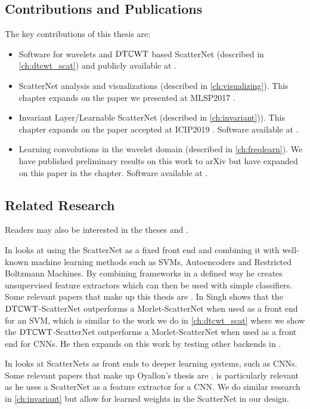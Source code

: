 \subsection{Contributions and Publications}
The key contributions of this thesis are:

\begin{itemize}
  \item Software for wavelets and $\mathrm{DT}\mathbb{C}\mathrm{WT}$ based ScatterNet (described in \autoref{ch:dtcwt_scat})
    and publicly available at \cite{cotter_pytorch_2018}.
  \item ScatterNet analysis and visualizations (described in
    \autoref{ch:visualizing}). This chapter expands on the paper we presented at MLSP2017
    \cite{cotter_visualizing_2017}.
  \item Invariant Layer/Learnable ScatterNet (described in \autoref{ch:invariant})). This chapter expands
    on the paper accepted at ICIP2019 \cite{cotter_learnable_2019}. Software
    available at \cite{cotter_learnable_2019-1}.
  \item Learning convolutions in the wavelet domain (described in
    \autoref{ch:freqlearn}). We have published preliminary results on this work
    to arXiv \cite{cotter_deep_2018} but have expanded on this paper in the
    chapter. Software available at \cite{cotter_dtcwt_2018}.
\end{itemize}

\subsection{Related Research}
Readers may also be interested in the theses \cite{singh_scatternet_2018} and
\cite{oyallon_analyzing_2017}.

In \cite{singh_scatternet_2018}
\citeauthor{singh_scatternet_2018} looks at using the ScatterNet as a fixed
front end and combining it with well-known machine learning methods such as
SVMs, Autoencoders and Restricted Boltzmann Machines. By combining frameworks in
a defined way he creates unsupervised feature extractors which can then be used
with simple classifiers. Some relevant papers that make up this thesis are \cite{singh_multi-resolution_2016,
singh_scatternet_2017, singh_generative_2018}. In
\cite{singh_multi-resolution_2016} Singh shows
that the $\mathrm{DT}\mathbb{C}\mathrm{WT}$-ScatterNet outperforms a Morlet-ScatterNet when used as a front end for
an SVM, which is similar to the work we do in \autoref{ch:dtcwt_scat} where we
show the $\mathrm{DT}\mathbb{C}\mathrm{WT}$-ScatterNet outperforms a Morlet-ScatterNet when used as a
front end for CNNs. He then expands on this work by testing other backends in
\cite{singh_scatternet_2017, singh_generative_2018}.

In \cite{oyallon_analyzing_2017}
\citeauthor{oyallon_analyzing_2017} looks at ScatterNets as front ends to
deeper learning systems, such as CNNs. Some relevant papers that make up Oyallon's thesis are
\cite{oyallon_deep_2015, oyallon_scaling_2017}. \cite{oyallon_scaling_2017}
is particularly relevant as he uses a ScatterNet as a feature extractor for a
CNN\@. We do similar research in \autoref{ch:invariant} but allow for
learned weights in the ScatterNet in our design.
